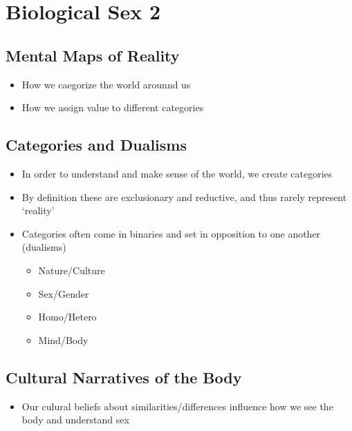 \documentclass[a4paper]{article}
\begin{document}
\section{Biological Sex 2} %
\subsection{Mental Maps of Reality}
\begin{itemize}
\item How we caegorize the world arounnd us
\item How we assign value to different categories
\end{itemize}

\subsection{Categories and Dualisms}
\begin{itemize}
\item In order to understand and make sense of the world, we create categories
\item By definition these are exclusionary and reductive, and thus rarely represent `reality'
\item Categories often come in binaries and set in opposition to one another (dualisms) \begin{itemize}
\item Nature/Culture
\item Sex/Gender
\item Homo/Hetero
\item Mind/Body
\end{itemize}
\end{itemize}

\subsection{Cultural Narratives of the Body}
\begin{itemize}
\item Our culural beliefs about similarities/differences influence how we see the body and understand sex
\end{itemize}
\end{document}
